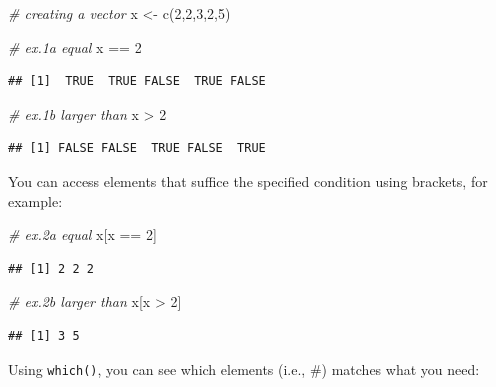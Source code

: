 \documentclass[
]{book}
\newenvironment{Shaded}{\begin{snugshade}}{\end{snugshade}}
\newcommand{\CommentTok}[1]{\textcolor[rgb]{0.56,0.35,0.01}{\textit{#1}}}
\newcommand{\DecValTok}[1]{\textcolor[rgb]{0.00,0.00,0.81}{#1}}
\newcommand{\FunctionTok}[1]{\textcolor[rgb]{0.00,0.00,0.00}{#1}}
\newcommand{\NormalTok}[1]{#1}
\newcommand{\OtherTok}[1]{\textcolor[rgb]{0.56,0.35,0.01}{#1}}
\newcommand{\SpecialCharTok}[1]{\textcolor[rgb]{0.00,0.00,0.00}{#1}}
\begin{document}
\begin{Shaded}
\begin{Highlighting}[]
\CommentTok{\# creating a vector}
\NormalTok{x }\OtherTok{\textless{}{-}} \FunctionTok{c}\NormalTok{(}\DecValTok{2}\NormalTok{,}\DecValTok{2}\NormalTok{,}\DecValTok{3}\NormalTok{,}\DecValTok{2}\NormalTok{,}\DecValTok{5}\NormalTok{)}

\CommentTok{\# ex.1a equal}
\NormalTok{x }\SpecialCharTok{==} \DecValTok{2}
\end{Highlighting}
\end{Shaded}

\begin{verbatim}
## [1]  TRUE  TRUE FALSE  TRUE FALSE
\end{verbatim}

\begin{Shaded}
\begin{Highlighting}[]
\CommentTok{\# ex.1b larger than}
\NormalTok{x }\SpecialCharTok{\textgreater{}} \DecValTok{2} 
\end{Highlighting}
\end{Shaded}

\begin{verbatim}
## [1] FALSE FALSE  TRUE FALSE  TRUE
\end{verbatim}

You can access elements that suffice the specified condition using brackets, for example:

\begin{Shaded}
\begin{Highlighting}[]
\CommentTok{\# ex.2a equal}
\NormalTok{x[x }\SpecialCharTok{==} \DecValTok{2}\NormalTok{]}
\end{Highlighting}
\end{Shaded}

\begin{verbatim}
## [1] 2 2 2
\end{verbatim}

\begin{Shaded}
\begin{Highlighting}[]
\CommentTok{\# ex.2b larger than}
\NormalTok{x[x }\SpecialCharTok{\textgreater{}} \DecValTok{2}\NormalTok{]}
\end{Highlighting}
\end{Shaded}

\begin{verbatim}
## [1] 3 5
\end{verbatim}

Using \texttt{which()}, you can see which elements (i.e., \#) matches what you need:
\end{document}
